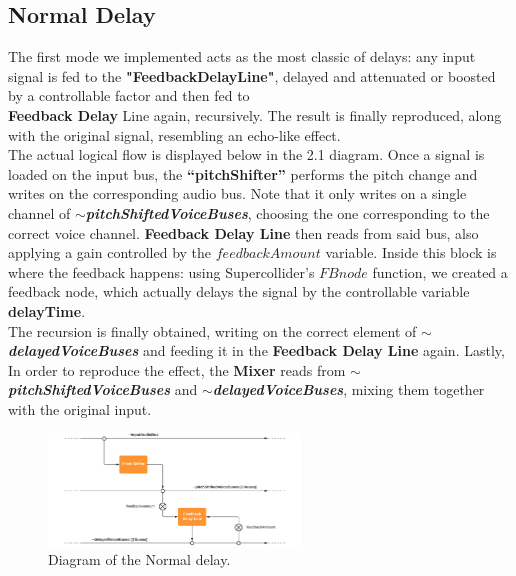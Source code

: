 \documentclass{article}
\begin{document}
\subsection{Normal Delay}
The first mode we implemented acts as the most classic of delays: any input signal is fed to the \textbf{"FeedbackDelayLine"}, delayed and attenuated or boosted by a controllable factor and then fed to \\ \textbf{Feedback Delay} Line again, recursively. The result is finally reproduced, along with the original signal, resembling an echo-like effect.
\\The actual logical flow is displayed below in the 2.1 diagram. Once a signal is loaded on the input bus, the \textbf{“pitchShifter”} performs the pitch change and writes on the corresponding audio bus. Note that it only writes on a single channel of \textbf{\textit{$\sim$pitchShiftedVoiceBuses}}, choosing the one corresponding to the correct voice channel. \textbf{Feedback Delay Line} then reads from said bus, also applying a gain controlled by the $feedbackAmount$ variable. Inside this block is where the feedback happens: using Supercollider’s $FBnode$ function, we created a feedback node, which actually delays the signal by the controllable variable \textbf{delayTime}. \\The recursion is finally obtained, writing on the correct element of \textbf{\textit{$\sim$delayedVoiceBuses}}  and feeding it in the \textbf{Feedback Delay Line} again. Lastly, In order to reproduce the effect, the \textbf{Mixer} reads from \textbf{\textit{$\sim$pitchShiftedVoiceBuses}} and \textbf{\textit{$\sim$delayedVoiceBuses}}, mixing them together with the original input.

\begin{figure}[H]
\centering
  \includegraphics[width=0.6\textwidth]{Normal_Feedback.png}
    \caption{Diagram of the Normal delay.}
\end{figure}
\end{document}
